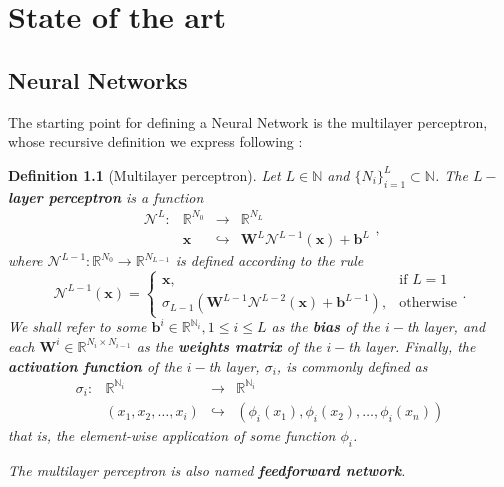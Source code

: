 \documentclass[12pt]{report} %
\newtheorem{definition}{Definition}
\newcommand{\tmmathbf}[1]{\ensuremath{\boldsymbol{#1}}}
\begin{document}
\chapter{State of the art}
\section{Neural Networks} \label{sec-neural-networks}
The starting point for defining a Neural Network is the multilayer perceptron, whose recursive definition we express following \cite{lu2021deepxde}:
\begin{definition}[Multilayer perceptron]
  Let \(L \in \mathbb{N}\) and \(\{ N_i \}_{i = 1}^L \subset \mathbb{N}\). The
  {\textbf{$L-$layer perceptron}} is a function
  \begin{equation}
      \begin{array}{llll}
       \mathcal{N}^L : & \mathbb{R}^{N_0} & \rightarrow & \mathbb{R}^{N_L}\\
       & \tmmathbf{x} & \hookrightarrow & \tmmathbf{W}^L \mathcal{N}^{L - 1}
       (\tmmathbf{x}) +\tmmathbf{b}^L
     \end{array},
     \label{perceptronRule}
  \end{equation}
  where \(\mathcal{N}^{L - 1} : \mathbb{R}^{N_0} \rightarrow \mathbb{R}^{N_{L- 1}}\) is defined according to the rule
  \[ \mathcal{N}^{L - 1} (\tmmathbf{x}) = \left\{\begin{array}{ll}
       \tmmathbf{x}, & \text{if } L = 1\\
       \sigma_{L - 1} (\tmmathbf{W}^{L - 1} \mathcal{N}^{L - 2} (\tmmathbf{x})
       +\tmmathbf{b}^{L - 1}), & \text{otherwise}
     \end{array}\right. . \]
  We shall refer to some \(\tmmathbf{b}^i \in \mathbb{R}^{\mathbb{N}_i}, 1 \leq i \leq L\) as the {\textbf{bias}} of the \(i -\)th layer, and each
  \(\tmmathbf{W}^i \in \mathbb{R}^{N_i \times N_{i - 1}}\) as the
  \textbf{weights matrix} of the \(i -\)th layer. Finally, the \textbf{activation function} of the $i
  -$th layer, \(\sigma_i\), is commonly defined as
  \[ \begin{array}{cccc}
       \sigma_i : & \mathbb{R}^{\mathbb{N}_i} & \rightarrow &
       \mathbb{R}^{\mathbb{N}_i}\\
       & (x_1, x_2, \ldots, x_i) & \hookrightarrow & (\phi_i (x_1), \phi_i (x_2),
       \ldots, \phi_i (x_n))
     \end{array} \]
  that is, the element-wise application of some function
  $\phi_i$.

  The multilayer perceptron is also named \textbf{feedforward network}.
\end{definition}
\end{document}
